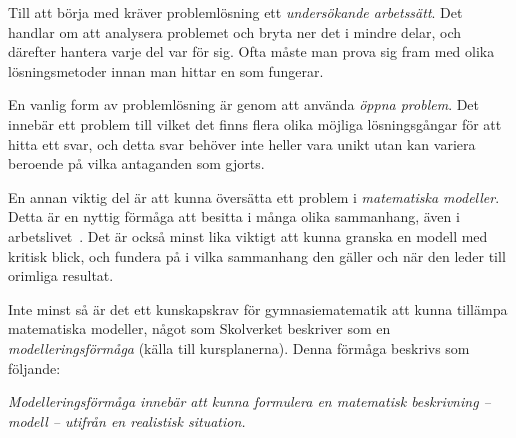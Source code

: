 
\textcolor{lila}{
    Till att börja med kräver problemlösning ett \textsl{undersökande arbetssätt}. Det handlar om att analysera problemet och bryta ner det i mindre delar, och därefter hantera varje del var för sig. Ofta måste man prova sig fram med olika lösningsmetoder innan man hittar en som fungerar.
}
        
\textcolor{lila}{
    En vanlig form av problemlösning är genom att använda \textsl{öppna problem}. Det innebär ett  problem till vilket det finns flera olika möjliga lösningsgångar för att hitta ett svar, och detta svar behöver inte heller vara unikt utan kan variera beroende på vilka antaganden som gjorts.
}

\textcolor{lila}{
    En annan viktig del är att kunna översätta ett problem i \textsl{matematiska modeller}. Detta är en nyttig förmåga att besitta i många olika sammanhang, även i arbetslivet~\cite{TheElephant}. Det är också minst lika viktigt att kunna granska en modell med kritisk blick, och fundera på i vilka sammanhang den gäller och när den leder till orimliga resultat.
}

\textcolor{Mahogany}{Inte minst så är det ett kunskapskrav för gymnasiematematik att kunna tillämpa matematiska modeller, något som Skolverket beskriver som en \textsl{modelleringsförmåga} \cite{ProblemDef} (källa till kursplanerna). Denna förmåga beskrivs som följande:}

\begin{displayquote}
    \textcolor{Mahogany}{
        \textsl{Modelleringsförmåga innebär att kunna formulera en matematisk beskrivning – modell – utifrån en realistisk situation.}
    }
\end{displayquote}

